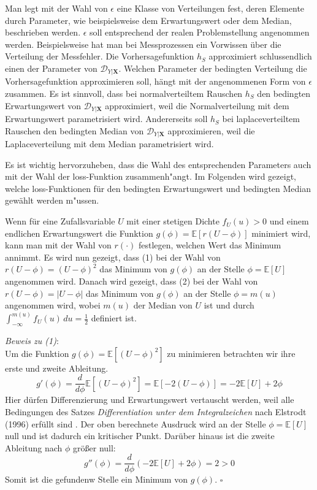 Man legt mit der Wahl von $\epsilon$ eine Klasse von Verteilungen fest, deren Elemente durch Parameter, wie beispielsweise dem Erwartungswert oder dem Median,
beschrieben werden. $\epsilon$ soll entsprechend der realen Problemstellung angenommen werden.
Beispielsweise hat man bei Messprozessen ein Vorwissen \"uber die Verteilung der Messfehler.
Die Vorhersagefunktion $h_S$ approximiert schlussendlich einen
der Parameter von $\mathcal{D}_{Y|\mathbf{X}}$. Welchen Parameter der bedingten Verteilung die Vorhersagefunktion approximieren soll, h\"angt
mit der angenommenen Form von $\epsilon$ zusammen. Es ist sinnvoll, dass bei normalverteiltem Rauschen
$h_S$ den bedingten Erwartungswert von $\mathcal{D}_{Y|\mathbf{X}}$ approximiert, weil die Normalverteilung mit dem Erwartungswert parametrisiert wird.
Andererseits soll $h_S$ bei laplaceverteiltem Rauschen den bedingten Median von $\mathcal{D}_{Y|\mathbf{X}}$ approximieren, weil die
Laplaceverteilung mit dem Median parametrisiert wird.

Es ist wichtig hervorzuheben, dass die Wahl des entsprechenden Parameters auch mit der Wahl der loss-Funktion zusammenh"angt.
Im Folgenden wird gezeigt, welche loss-Funktionen f\"ur den bedingten Erwartungswert und bedingten Median gew\"ahlt werden m"ussen.

Wenn f\"ur eine Zufallsvariable $U$ mit einer stetigen Dichte $f_U(u) > 0$ und einem endlichen Erwartungswert die Funktion $g(\phi) = \mathbb{E}[r(U - \phi)]$ minimiert wird,
kann man mit der Wahl von $r(\cdot)$
festlegen, welchen Wert das Minimum annimmt. Es wird nun gezeigt, dass (1) bei der Wahl von $r(U - \phi) = (U - \phi)^2$ das Minimum von $g(\phi)$ an der Stelle
$\phi = \mathbb{E}[U]$ angenommen wird. Danach wird gezeigt, dass (2) bei der Wahl von $r(U - \phi) = |U - \phi|$ das Minimum von $g(\phi)$ an der Stelle
$\phi = m(u)$ angenommen wird, wobei $m(u)$ der Median von $U$ ist und durch $\int_{-\infty}^{m(u)} f_U(u) \, du = \frac{1}{2}$ definiert ist.

\textit{Beweis zu (1)}: \\
Um die Funktion $g(\phi) = \mathbb{E}[(U - \phi)^2]$ zu minimieren betrachten wir ihre erste und zweite Ableitung.
$$ g'(\phi) = \frac{d}{d\phi}\mathbb{E}[(U-\phi)^2] = \mathbb{E}[-2(U-\phi)] = -2\mathbb{E}[U] + 2\phi$$
Hier d\"urfen Differenzierung und Erwartungswert vertauscht werden, weil alle Bedingungen des Satzes \textit{Differentiation unter dem Integralzeichen}
nach Elstrodt (1996) erf\"ullt sind \cite[Kapitel 4, Satz 5.7]{elstrodt}.
Der oben berechnete Ausdruck wird an der Stelle $\phi = \mathbb{E}[U]$ null und ist dadurch ein kritischer Punkt. Dar\"uber hinaus ist die zweite
Ableitung nach $\phi$ gr\"o{\ss}er null:
$$g''(\phi) = \frac{d}{d\phi}(-2\mathbb{E}[U]+2\phi) = 2 > 0$$
Somit ist die gefundenw Stelle ein Minimum von $g(\phi)$. $\square$

